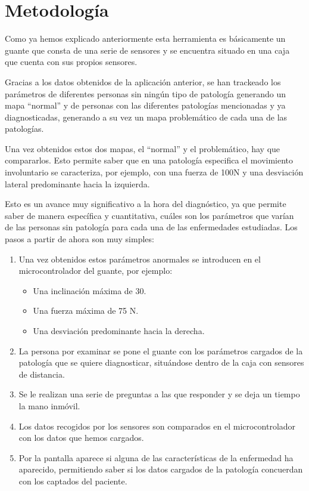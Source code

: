 \section{Metodología}

Como ya hemos explicado anteriormente esta herramienta es básicamente un guante que consta de una serie de sensores y se encuentra situado en una caja que cuenta con sus propios sensores. 

Gracias a los datos obtenidos de la aplicación anterior, se han trackeado los parámetros de diferentes personas sin ningún tipo de patología generando un mapa “normal” y de personas con las diferentes patologías mencionadas y ya diagnosticadas, generando a su vez un mapa problemático de cada una de las patologías.

Una vez obtenidos estos dos mapas, el “normal” y el problemático, hay que compararlos. Esto permite saber que en una patología especifica el movimiento involuntario se caracteriza, por ejemplo, con una fuerza de 100N y una desviación lateral predominante hacia la izquierda.

Esto es un avance muy significativo a la hora del diagnóstico, ya que permite saber de manera específica y cuantitativa, cuáles son los parámetros que varían de las personas sin patología para cada una de las enfermedades estudiadas. Los pasos a partir de ahora son muy simples:

\begin{enumerate}
    \item Una vez obtenidos estos parámetros anormales se introducen en el microcontrolador del guante, por ejemplo:
	\begin{itemize}
		\item Una inclinación máxima de 30\textdegree.
		\item Una fuerza máxima de 75 N.
		\item Una desviación predominante hacia la derecha.
	\end{itemize}
    \item La persona por examinar se pone el guante con los parámetros cargados de la patología que se quiere diagnosticar, situándose dentro de la caja con sensores de distancia.
    \item Se le realizan una serie de preguntas a las que responder y se deja un tiempo la mano inmóvil.
    \item Los datos recogidos por los sensores son comparados en el microcontrolador con los datos que hemos cargados.
    \item Por la pantalla aparece si alguna de las características de la enfermedad ha aparecido, permitiendo saber si los datos cargados de la patología concuerdan con los captados del paciente.
\end{enumerate}

